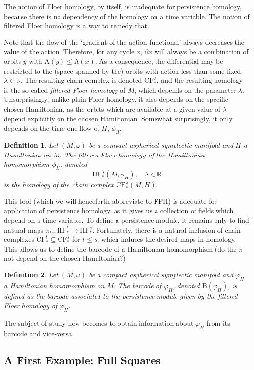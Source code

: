 \documentclass{article}
\newtheorem{definition}{Definition}
\theoremstyle{nonumberplain}
\newcommand{\R}{\mathbb{R}}
\renewcommand{\AA}{\mathrm{A}}
\newcommand{\BB}{\mathrm{B}}
\newcommand{\CF}{\mathrm{CF}}
\newcommand{\HF}{\mathrm{HF}}
\begin{document}
The notion of Floer homology, by itself, is inadequate for persistence homology, because there is no dependency of the homology on a time variable. The notion of filtered Floer homology is a way to remedy that.

Note that the flow of the `gradient of the action functional' always decreases the value of the action. Therefore, for any cycle $x$, $\partial x$ will always be a combination of orbits $y$ with $\AA(y) \leq \AA(x)$. As a consequence, the differential may be restricted to the (space spanned by the) orbits with action less than some fixed $\lambda \in \R$. The resulting chain complex is denoted $\CF_*^\lambda$, and the resulting homology is the so-called \emph{filtered Floer homology} of $M$, which depends on the parameter $\lambda$. Unsurprisingly, unlike plain Floer homology, it also depends on the specific chosen Hamiltonian, as the orbits which are available at a given value of $\lambda$ depend explicitly on the chosen Hamiltonian. Somewhat surprisingly, it only depends on the time-one flow of $H$, $\phi_H$.

\begin{definition}
Let $(M,\omega)$ be a compact aspherical symplectic manifold and $H$ a Hamiltonian on $M$. The \emph{filtered Floer homology} of the Hamiltonian homomorphism $\phi_H$, denoted
\[\HF^\lambda_*(M,\phi_H), \quad \lambda \in \R\]
is the homology of the chain complex $\CF^\lambda_*(M,H)$.
\end{definition}

This tool (which we will henceforth abbreviate to FFH) is adequate for application of persistence homology, as it gives us a collection of fields which depend on a time variable. To define a persistence module, it remains only to find natural maps $\pi_{ts} \colon \HF^t_* \to \HF^s_*$. Fortunately, there is a natural inclusion of chain complexes $\CF^t_* \subseteq \CF^s_*$ for $t \leq s$, which induces the desired maps in homology. This allows us to define the barcode of a Hamiltonian homomorphism (do the $\pi$ not depend on the chosen Hamiltonian?)

\begin{definition}
Let $(M,\omega)$ be a compact aspherical symplectic manifold and $\varphi_H$ a Hamiltonian homomorphism on $M$. The \emph{barcode of $\varphi_H$}, denoted $\BB(\varphi_H)$, is defined as the barcode associated to the persistence module given by the filtered Floer homology of $\varphi_H$.
\end{definition}

The subject of study now becomes to obtain information about $\varphi_H$ from its barcode and vice-versa.

\subsection{A First Example: Full Squares}





\end{document}
